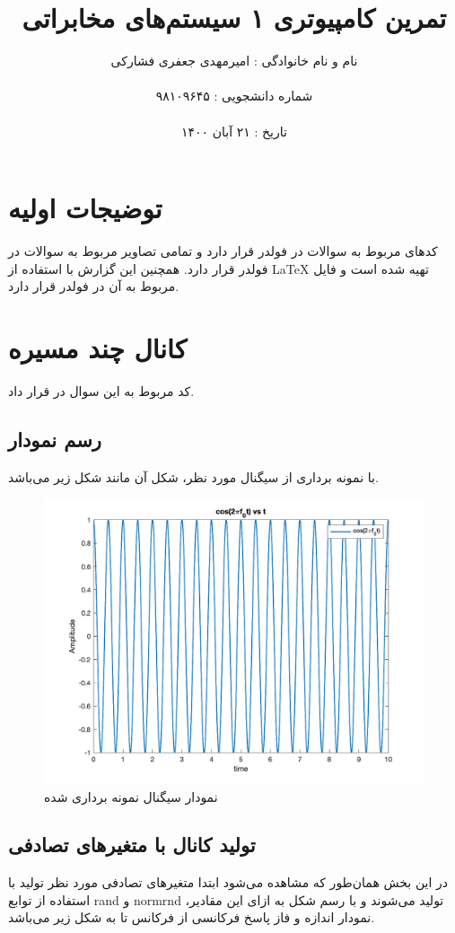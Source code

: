 \documentclass[10pt]{article}
\title{تمرین کامپیوتری ۱ سیستم‌های مخابراتی}
\author{نام و نام‌ خانوادگی : امیرمهدی جعفری فشارکی
\\ \\
شماره دانشجویی : ۹۸۱۰۹۶۴۵ 	\\ \\
تاریخ : ۲۱ آبان ۱۴۰۰}
\date{}
\begin{document}
	\maketitle
	\pagebreak
	\tableofcontents
	\newpage
	\section{توضیجات اولیه}
	کد‌های مربوط به سوالات در فولدر 
	قرار دارد و تمامی تصاویر مربوط به سوالات در فولدر 
	قرار دارد.
	همچنین این گزارش با استفاده از
	 \LaTeX
	 تهیه شده است و فایل 
	 مربوط به آن در فولدر 
	 قرار دارد.
	\section{کانال چند مسیره}
	کد‌ مربوط به این سوال در 
	قرار داد.
	\subsection{رسم نمودار 
	}
	با نمونه برداری از سیگنال مورد نظر، شکل آن مانند شکل زیر
	می‌باشد.
	\begin{figure}[h]
		\centering
		\includegraphics[width=0.9\linewidth]{../pics/q1-1}
		\caption{نمودار سیگنال نمونه برداری شده}
		\label{q1-1}
	\end{figure}
	\newpage
	\subsection{تولید کانال با متغیرهای تصادفی}
	در این بخش همان‌طور که مشاهده می‌شود ابتدا متغیرهای تصادفی مورد نظر تولید با استفاده از توابع rand و normrnd تولید می‌شوند و با رسم شکل به ازای این مقادیر، نمودار اندازه و فاز پاسخ فرکانسی از فرکانس 
	تا
	به شکل زیر می‌باشد.
	
\end{document}
